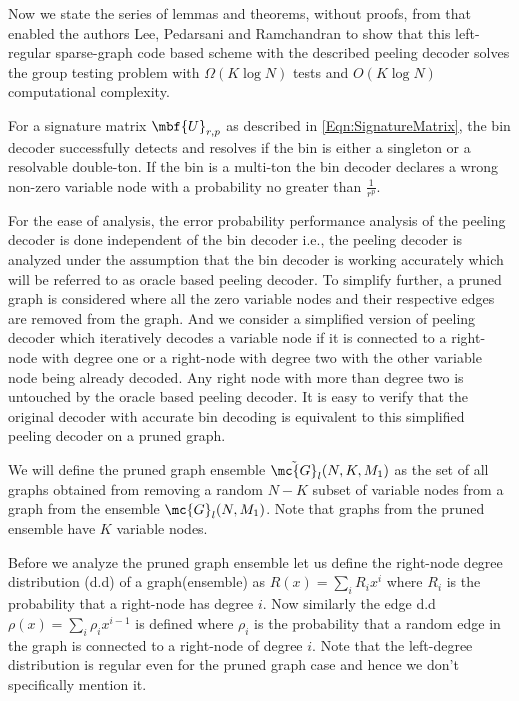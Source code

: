 \documentclass[conference,twocolumn]{IEEEtran}
\begin{document}
Now we state the series of lemmas and theorems, without proofs, from \cite{lee2015saffron} that enabled the authors Lee, Pedarsani and Ramchandran to show that this left-regular sparse-graph code based scheme with the described peeling decoder solves the group testing problem with $\Omega( K\log N)$ tests and $O(K\log N)$ computational complexity.

\begin{lemma}
\label{Lem:BinDecoderAnalysis}
For a signature matrix $\mbf{U}_{r,p}$ as described in \eqref{Eqn:SignatureMatrix}, the bin decoder successfully detects and resolves if the bin is either a singleton or a resolvable double-ton. If the bin is a multi-ton the bin decoder declares a wrong non-zero variable node with a probability no greater than $\frac{1}{r^p}$.
\end{lemma}

For the ease of analysis, the error probability performance analysis of the peeling decoder is done independent of the bin decoder i.e., the peeling decoder is analyzed under the assumption that the bin decoder is working accurately which will be referred to as oracle based peeling decoder. To simplify further, a pruned graph is considered where all the zero variable nodes and their respective edges are removed from the graph. And we consider a simplified version of peeling decoder which iteratively decodes a variable node if it is connected to a right-node with degree one or a right-node with degree two with the other variable node being already decoded. Any right node with more than degree two is untouched by the oracle based peeling decoder. It is easy to verify that the original decoder with accurate bin decoding is equivalent to this simplified peeling decoder on a pruned graph.

\begin{definition}
We will define the pruned graph ensemble $\tilde{\mc{G}}_l(N,K,M_1)$ as the set of all graphs obtained from removing a random $N-K$ subset of variable nodes from a graph from the ensemble $\mc{G}_l(N,M_1)$. Note that graphs from the pruned ensemble have $K$ variable nodes. 
\end{definition}	

Before we analyze the pruned graph ensemble let us define the right-node degree distribution (d.d) of a graph(ensemble) as $R(x)=\sum_{i}R_i x^i$ where $R_i$ is the probability that a right-node has degree $i$. Now similarly the edge d.d $\rho(x)=\sum_{i}\rho_ix^{i-1}$ is defined where $\rho_i$ is the probability that a random edge in the graph is connected to a right-node of degree $i$. Note that the left-degree distribution is regular even for the pruned graph case and hence we don't specifically mention it.
\end{document}
